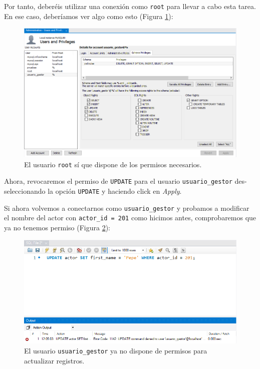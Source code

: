 \documentclass[a4paper]{article}
\begin{document}
Por tanto, deberéis utilizar una conexión como \texttt{root} para llevar a cabo esta tarea. En ese caso, deberíamos ver algo como esto (Figura \ref{fig:gestor-root}):

\begin{figure}[H]
    \centering
    \includegraphics[width=1\linewidth]{figs/gestion-usuarios/gestor-usuarios-root.png}
    \caption{El usuario \texttt{root} sí que dispone de los permisos necesarios.}
    \label{fig:gestor-root}
\end{figure}

Ahora, revocaremos el permiso de \texttt{UPDATE} para el usuario \texttt{usuario\_gestor} des-seleccionando la opción \texttt{UPDATE} y haciendo click en \textit{Apply}.

Si ahora volvemos a conectarnos como \texttt{usuario\_gestor} y probamos a modificar el nombre del actor con \texttt{actor\_id = 201} como hicimos antes, comprobaremos que ya no tenemos permiso (Figura \ref{fig:usr_update_revocado}):

\begin{figure}[H]
    \centering
    \includegraphics[width=1\linewidth]{figs/gestion-usuarios/usr_update_revocado.png}
    \caption{El usuario \texttt{usuario\_gestor} ya no dispone de permisos para actualizar registros.}
    \label{fig:usr_update_revocado}
\end{figure}
\end{document}
